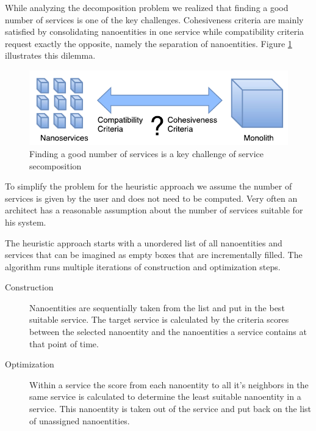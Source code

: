 While analyzing the decomposition problem we realized that finding a good number of services is one of the key challenges. Cohesiveness criteria are mainly satisfied by consolidating nanoentities in one service while compatibility criteria request exactly the opposite, namely the separation of nanoentities. Figure \ref{fig:numberOfServices} illustrates this dilemma.

\begin{figure}[H]
	\begin{center}
		\includegraphics[scale=1]{diagrams/HeuristicApproach.pdf}
	\end{center}
	\caption{Finding a good number of services is a key challenge of service secomposition}
	\label{fig:numberOfServices}
\end{figure}

To simplify the problem for the heuristic approach we assume the number of services is given by the user and does not need to be computed. Very often an architect has a reasonable assumption about the number of services suitable for his system.

The heuristic approach starts with a unordered list of all nanoentities and services that can be imagined as empty boxes that are incrementally filled. The algorithm runs multiple iterations of construction and optimization steps.

\begin{description}
	\item[Construction] Nanoentities are sequentially taken from the list and put in the best suitable service. The target service is calculated by the criteria scores between the selected nanoentity and the nanoentities a service contains at that point of time. 
	\item[Optimization] Within a service the score from each nanoentity to all it's neighbors in the same service is calculated to determine the least suitable nanoentity in a service. This nanoentity is taken out of the service and put back on the list of unassigned nanoentities.
\end{description}


